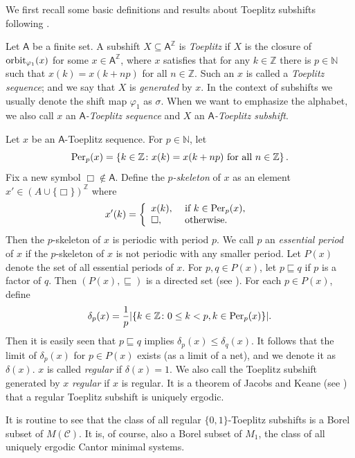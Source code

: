 \documentclass{amsart}
\theoremstyle{definition}
\theoremstyle{problem}
\theoremstyle{remark}
\numberwithin{equation}{section}
\newcommand{\orb}{\mbox{\rm orbit}}
\begin{document}
We first recall some basic definitions and results about Toeplitz subshifts following \cite{Williams}. 

Let $\mathsf{A}$ be a finite set. A subshift $X\subseteq \mathsf{A}^\mathbb{Z}$ is {\em Toeplitz} if $X$ is the closure of $\orb_{\varphi_1}(x)$ for some $x\in \mathsf{A}^\mathbb{Z}$, where $x$ satisfies that for any $k\in\mathbb{Z}$ there is $p\in \mathbb{N}$ such that $x(k)=x(k+np)$ for all $n\in\mathbb{Z}$. Such an $x$ is called a {\em Toeplitz sequence}; and we say that $X$ is {\em generated} by $x$. In the context of subshifts we usually denote the shift map $\varphi_1$ as $\sigma$. When we want to emphasize the alphabet, we also call $x$ an {\em $\mathsf{A}$-Toeplitz sequence} and $X$ an {\em $\mathsf{A}$-Toeplitz subshift}. 

Let $x$ be an $\mathsf{A}$-Toeplitz sequence. For $p\in \mathbb{N}$, let
$$ \mbox{\rm Per}_p(x)=\left\{k\in \mathbb{Z}\colon x(k)=x(k+np) \mbox{ for all $n\in \mathbb{Z}$}\right\}. $$
Fix a new symbol $\Box\not\in \mathsf{A}$. Define the {\em $p$-skeleton} of $x$ as an element $x'\in (A\cup\{\Box\})^\mathbb{Z}$ where 
$$ x'(k)=\left\{\begin{array}{ll} x(k), & \mbox{ if $k\in \mbox{\rm Per}_p(x)$, }\\ \Box, & \mbox{ otherwise.}\end{array}\right. $$
Then the $p$-skeleton of $x$ is periodic with period $p$. We call $p$ an {\em essential period} of $x$ if the $p$-skeleton of $x$ is not periodic with any smaller period. Let $P(x)$ denote the set of all essential periods of $x$. For $p, q\in P(x)$, let $p\sqsubseteq q$ if $p$ is a factor of $q$. Then $(P(x), \sqsubseteq)$ is a directed set (see \cite[Proposition 2.1]{Williams}). For each $p\in P(x)$, define
$$ \delta_p(x)=\displaystyle\frac{1}{p}|\{k\in \mathbb{Z}\colon 0\leq k<p, k\in \mbox{\rm Per}_p(x)\}|. $$
Then it is easily seen that $p\sqsubseteq q$ implies $\delta_p(x)\leq \delta_q(x)$. It follows that the limit of $\delta_p(x)$ for $p\in P(x)$ exists (as a limit of a net), and we denote it as $\delta(x)$. $x$ is called {\em regular} if $\delta(x)=1$. We also call the Toeplitz subshift generated by $x$ {\em regular} if $x$ is regular. It is a theorem of Jacobs and Keane (see \cite[Theorem 2.6]{Williams}) that a regular Toeplitz subshift is uniquely ergodic.

It is routine to see that the class of all regular $\{0,1\}$-Toeplitz subshifts is a Borel subset of $M(\mathcal{C})$. It is, of course, also a Borel subset of $M_1$, the class of all uniquely ergodic Cantor minimal systems.
\end{document}
